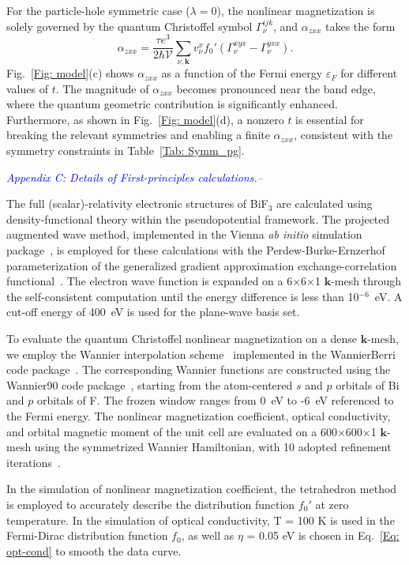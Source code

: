 \documentclass[aps,prl,twocolumn,amsmath,amssymb,showpacs, superscriptaddress,notitlepage,longbibliography,10pt]{revtex4-1}
\begin{document}
For the particle-hole symmetric case ($\lambda=0$), the nonlinear magnetization is solely governed by the quantum Christoffel symbol $\Gamma_\nu^{ijk}$, and  $\alpha_{zxx}$ takes the form
\begin{equation}\label{Eq: alpha_zxx}
\alpha_{zxx}=\frac{\tau e^3}{2\hbar\mathcal{V}}\sum_{\nu,\mathbf{k}}v_\nu^x f_0'(\Gamma_\nu^{xyx}-\Gamma_\nu^{yxx}).
\end{equation}
Fig.~\ref{Fig: model}(c) shows $\alpha_{zxx}$ as a function of the Fermi energy $\varepsilon_F$ for different values of $t$. The magnitude of $\alpha_{zxx}$ becomes pronounced near the band edge, where the quantum geometric contribution is significantly enhanced. Furthermore, as shown in Fig.~\ref{Fig: model}(d), a nonzero $t$ is essential for breaking the relevant symmetries and enabling a finite $\alpha_{zxx}$, consistent with the symmetry constraints in Table~\ref{Tab: Symm_pg}.


\hypertarget{Appendix C}{\textit{\textcolor{blue}{Appendix C: Details of First-principles calculations.}--}}
The full (scalar)-relativity electronic structures of BiF$_3$ are calculated using density-functional theory within the pseudopotential framework. The projected augmented wave method, implemented in the Vienna \textit{ab initio} simulation package~\cite{kresse1996efficiency,kresse1999ultrasoft,kresse19962}, is employed for these calculations with the Perdew-Burke-Ernzerhof parameterization of the
generalized gradient approximation exchange-correlation functional~\cite{gga-pbe}. The electron wave function is expanded on a 6$\times$6$\times$1 $\mathbf{k}$-mesh through the self-consistent computation until the energy difference is less than 10$^{-6}$~eV. A cut-off energy of 400~eV is used for the plane-wave basis set.

To evaluate the quantum Christoffel nonlinear magnetization on a dense $\mathbf{k}$-mesh, we employ the Wannier interpolation scheme~\cite{wang-prb06} implemented in the WannierBerri code package~\cite{wannierberri}. The corresponding Wannier functions are constructed using the Wannier90 code package~\cite{wannier90}, starting from the atom-centered $s$ and $p$ orbitals of Bi and $p$ orbitals of F. The frozen window ranges from 0~eV to -6~eV referenced to the Fermi energy. The nonlinear magnetization coefficient, optical conductivity, and orbital magnetic moment of the unit cell are evaluated on a 600$\times$600$\times$1 $\mathbf{k}$-mesh using the symmetrized Wannier Hamiltonian, with 10 adopted refinement iterations~\cite{wannierberri}.

In the simulation of nonlinear magnetization coefficient, the tetrahedron method~\cite{tetrahedronmethod,tetrahedronmethod2} is employed to accurately describe the distribution function $f_0'$ at zero temperature. In the simulation of optical conductivity, T = 100 K is used in the Fermi-Dirac distribution function $f_0$, as well as $\eta$ = 0.05 eV is chosen in Eq.~\eqref{Eq: opt-cond} to smooth the data curve.
\end{document}
